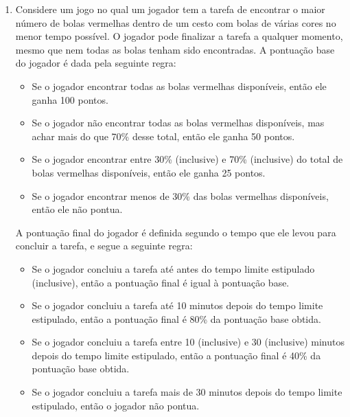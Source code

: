 \begin{enumerate}[label=\textbf{Q\arabic*.}]
\begin{center}
    \end{center}

    

    \vspace{0.5cm}

    \item Considere um jogo no qual um jogador tem a tarefa de encontrar o maior número de bolas vermelhas dentro de um cesto com bolas de várias cores no menor tempo possível. O jogador pode finalizar a tarefa a qualquer momento, mesmo que nem todas as bolas tenham sido encontradas. A pontuação base do jogador é dada pela seguinte regra:
    
    \begin{itemize}
        \item Se o jogador encontrar todas as bolas vermelhas disponíveis, então ele ganha 100 pontos.
        \item Se o jogador não encontrar todas as bolas vermelhas disponíveis, mas achar mais do que 70\% desse total, então ele ganha 50 pontos.
        \item Se o jogador encontrar entre 30\% (inclusive) e 70\% (inclusive) do total de bolas vermelhas disponíveis, então ele ganha 25 pontos.
        \item Se o jogador encontrar menos de 30\% das bolas vermelhas disponíveis, então ele não pontua.
    \end{itemize}

    A pontuação final do jogador é definida segundo o tempo que ele levou para concluir a tarefa, e segue a seguinte regra:

    \begin{itemize}
        \item Se o jogador concluiu a tarefa até antes do tempo limite estipulado (inclusive), então a pontuação final é igual à pontuação base.
        \item Se o jogador concluiu a tarefa até 10 minutos depois do tempo limite estipulado, então a pontuação final é 80\% da pontuação base obtida.
        \item Se o jogador concluiu a tarefa entre 10 (inclusive) e 30 (inclusive) minutos depois do tempo limite estipulado, então a pontuação final é 40\% da pontuação base obtida.
        \item Se o jogador concluiu a tarefa mais de 30 minutos depois do tempo limite estipulado, então o jogador não pontua.
    \end{itemize}


\end{enumerate}

